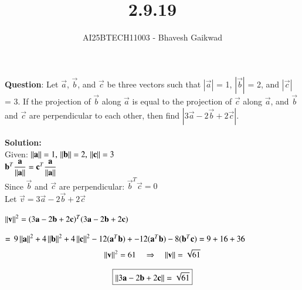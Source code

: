 \documentclass[journal]{IEEEtran}
\begin{document}

\vspace{3cm}

\title{2.9.19}
\author{AI25BTECH11003 - Bhavesh Gaikwad}
{\let\newpage\relax\maketitle}

\renewcommand{\thefigure}{\theenumi}
\renewcommand{\thetable}{\theenumi}
\setlength{\intextsep}{10pt} 


\renewcommand{\thetable}{\theenumi}


\textbf{Question}: Let $\overrightarrow{a}$,
$\overrightarrow{b}$, and $\overrightarrow{c}$ be three vectors such that $|\overrightarrow{a}|$ = 1, $|\overrightarrow{b}|$ = 2, and $|\overrightarrow{c}|$ = 3. If the
projection of $\overrightarrow{b}$ along $\overrightarrow{a}$ is equal to the projection of $\overrightarrow{c}$ along $\overrightarrow{a}$, and $\overrightarrow{b}$ and $\overrightarrow{c}$ are perpendicular to each other, then find $|3\overrightarrow{a} - 2\overrightarrow{b} + 2\overrightarrow{c}|$. \\\\


\textbf{Solution:}\\
Given: $\left\lVert\mathbf{a}\right\rVert = 1, \, \left\lVert\mathbf{b}\right\rVert = 2, \, \left\lVert\mathbf{c}\right\rVert = 3$\\

$\mathbf{b}^T\dfrac{\mathbf{a}}{\left\lVert\mathbf{a}\right\rVert} = \mathbf{c}^T\dfrac{\mathbf{a}}{\left\lVert\mathbf{a}\right\rVert}$\\

Since $\vec{b}$ and $\vec{c}$ are perpendicular: $\vec{b}^T\vec{c} = 0$ \\

Let $\vec{v} = 3\vec{a} - 2\vec{b} + 2\vec{c}$

$\left\lVert\mathbf{v}\right\rVert^2 = (3\mathbf{a} - 2\mathbf{b} + 2\mathbf{c})^T(3\mathbf{a} - 2\mathbf{b} + 2\mathbf{c})$

$= \, 9\left\lVert\mathbf{a}\right\rVert^2 + 4\left\lVert\mathbf{b}\right\rVert^2 + 4\left\lVert\mathbf{c}\right\rVert^2 -12(\mathbf{a}^T\mathbf{b}) + -12(\mathbf{a}^T\mathbf{b}) - 8(\mathbf{b}^T\mathbf{c}) = 9 + 16 + 36$\\

\begin{align}
    \centering
    \norm{\vec{v}}^2 = 61 
    \quad \Rightarrow \quad
    \norm{\vec{v}} = \sqrt{61}
\end{align}

\begin{align}
\centering
\boxed{\norm{3\vec{a} - 2\vec{b} + 2\vec{c}} = \sqrt{61}}
\end{align}
\end{document}
